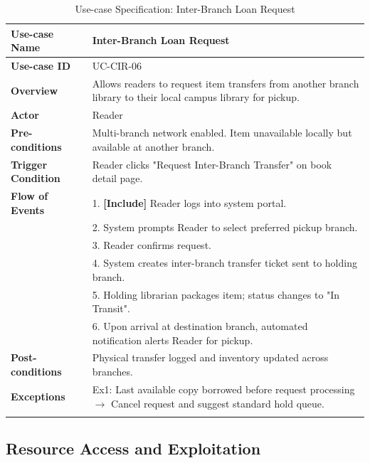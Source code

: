 \newpage
\begin{longtable}{|p{3.5cm}|p{11.5cm}|}
    \hline
    \textbf{Use-case Name} & \textbf{Inter-Branch Loan Request} \\
    \hline
    \textbf{Use-case ID} & UC-CIR-06 \\
    \hline
    \textbf{Overview} & Allows readers to request item transfers from another branch library to their local campus library for pickup. \\
    \hline
    \textbf{Actor} & Reader \\
    \hline
    \textbf{Pre-conditions} & Multi-branch network enabled. Item unavailable locally but available at another branch. \\
    \hline
    \textbf{Trigger Condition} & Reader clicks "Request Inter-Branch Transfer" on book detail page. \\
    \hline
    \textbf{Flow of Events} & 
    1. \textbf{[Include]} Reader logs into system portal.\\ 
 & 
    2. System prompts Reader to select preferred pickup branch.\\ 
 & 
    3. Reader confirms request.\\ 
 & 
    4. System creates inter-branch transfer ticket sent to holding branch.\\ 
 & 
    5. Holding librarian packages item; status changes to "In Transit".\\ 
 & 
    6. Upon arrival at destination branch, automated notification alerts Reader for pickup. \\
    \hline
    \textbf{Post-conditions} & Physical transfer logged and inventory updated across branches. \\
    \hline
    \textbf{Exceptions} & 
    Ex1: Last available copy borrowed before request processing $\rightarrow$ Cancel request and suggest standard hold queue. \\
    \hline
    \caption{Use-case Specification: Inter-Branch Loan Request} \\
\end{longtable}

\subsection{Resource Access and Exploitation}

